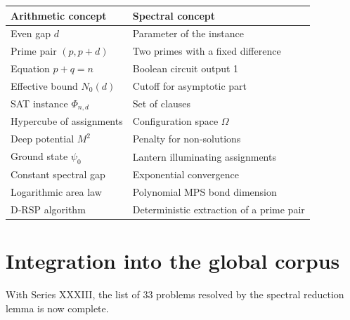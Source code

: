 \documentclass[11pt,a4paper]{article}
\begin{document}
\begin{center}
\small
\begin{tabular}{@{}l|l@{}}
\toprule
\textbf{Arithmetic concept} & \textbf{Spectral concept} \\
\midrule
Even gap \(d\) & Parameter of the instance \\
Prime pair \((p,p+d)\) & Two primes with a fixed difference \\
Equation \(p+q=n\) & Boolean circuit output 1 \\
Effective bound \(N_0(d)\) & Cutoff for asymptotic part \\
SAT instance \(\Phi_{n,d}\) & Set of clauses \\
Hypercube of assignments & Configuration space \(\Omega\) \\
Deep potential \(M^2\) & Penalty for non‑solutions \\
Ground state \(\psi_0\) & Lantern illuminating assignments \\
Constant spectral gap & Exponential convergence \\
Logarithmic area law & Polynomial MPS bond dimension \\
D‑RSP algorithm & Deterministic extraction of a prime pair \\
\bottomrule
\end{tabular}
\end{center}

\section{Integration into the global corpus}

With Series XXXIII, the list of 33 problems resolved by the spectral reduction lemma is now complete.
\end{document}
